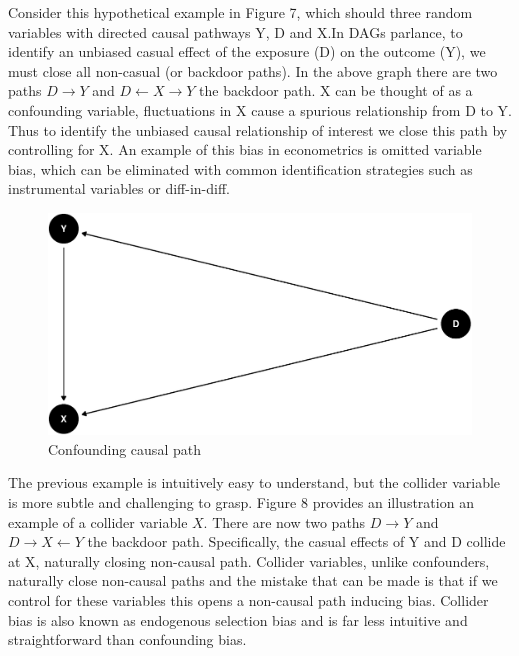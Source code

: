 \documentclass[
  10pt,
]{article}
\begin{document}
Consider this hypothetical example in Figure 7, which should three
random variables with directed causal pathways Y, D and X.In DAGs
parlance, to identify an unbiased casual effect of the exposure (D) on
the outcome (Y), we must close all non-casual (or backdoor paths). In
the above graph there are two paths \(D \rightarrow Y\) and
\(D \leftarrow X \rightarrow Y\) the backdoor path. X can be thought of
as a confounding variable, fluctuations in X cause a spurious
relationship from D to Y. Thus to identify the unbiased causal
relationship of interest we close this path by controlling for X. An
example of this bias in econometrics is omitted variable bias, which can
be eliminated with common identification strategies such as instrumental
variables or diff-in-diff.

\begin{figure}[H]
\includegraphics{figures/paper-unnamed-chunk-3-1} \caption{Confounding causal path}\label{fig:unnamed-chunk-3}
\end{figure}

The previous example is intuitively easy to understand, but the collider
variable is more subtle and challenging to grasp. Figure 8 provides an
illustration an example of a collider variable \(X\). There are now two
paths \(D \rightarrow Y\) and \(D \rightarrow X \leftarrow Y\) the
backdoor path. Specifically, the casual effects of Y and D collide at X,
naturally closing non-causal path. Collider variables, unlike
confounders, naturally close non-causal paths and the mistake that can
be made is that if we control for these variables this opens a
non-causal path inducing bias. Collider bias is also known as endogenous
selection bias and is far less intuitive and straightforward than
confounding bias.
\end{document}
